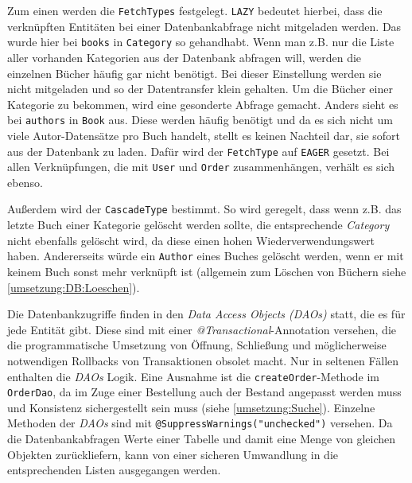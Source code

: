 		Zum einen werden die \texttt{FetchTypes} festgelegt. \texttt{LAZY} bedeutet hierbei, dass die verknüpften Entitäten bei einer Datenbankabfrage nicht mitgeladen werden. Das wurde hier bei \texttt{books} in \texttt{Category} so gehandhabt. Wenn man z.B. nur die Liste aller vorhanden Kategorien aus der Datenbank abfragen will, werden die einzelnen Bücher häufig gar nicht benötigt. Bei dieser Einstellung werden sie nicht mitgeladen und so der Datentransfer klein gehalten. Um die Bücher einer Kategorie zu bekommen, wird eine gesonderte Abfrage gemacht. Anders sieht es bei \texttt{authors} in \texttt{Book} aus. Diese werden häufig benötigt und da es sich nicht um viele Autor-Datensätze pro Buch handelt, stellt es keinen Nachteil dar, sie sofort aus der Datenbank zu laden. Dafür wird der \texttt{FetchType} auf \texttt{EAGER} gesetzt. Bei allen Verknüpfungen, die mit \texttt{User} und \texttt{Order} zusammenhängen, verhält es sich ebenso.
		
		Außerdem wird der \texttt{CascadeType} bestimmt. So wird geregelt, dass wenn z.B. das letzte Buch einer Kategorie gelöscht werden sollte, die entsprechende \textit{Category} nicht ebenfalls gelöscht wird, da diese einen hohen Wiederverwendungswert haben. Andererseits würde ein \texttt{Author} eines Buches gelöscht werden, wenn er mit keinem Buch sonst mehr verknüpft ist (allgemein zum Löschen von Büchern siehe \ref{umsetzung:DB:Loeschen}).
		
		Die Datenbankzugriffe finden in den \textit{Data Access Objects (DAOs)} statt, die es für jede Entität gibt. Diese sind mit einer \textit{@Trans\-actio\-nal}-Annotation versehen, die die programmatische Umsetzung von Öffnung, Schließung und möglicherweise notwendigen Rollbacks von Transaktionen obsolet macht. Nur in seltenen Fällen enthalten die \textit{DAOs} Logik. Eine Ausnahme ist die \texttt{createOrder}-Methode im \texttt{OrderDao}, da im Zuge einer Bestellung auch der Bestand angepasst werden muss und Konsistenz sichergestellt sein muss (siehe \ref{umsetzung:Suche}). Einzelne Methoden der \textit{DAOs} sind mit \lstinline|@SuppressWarnings("unchecked")| versehen. Da die Datenbankabfragen Werte einer Tabelle und damit eine Menge von gleichen Objekten zurückliefern, kann von einer sicheren Umwandlung in die entsprechenden Listen ausgegangen werden.
		
